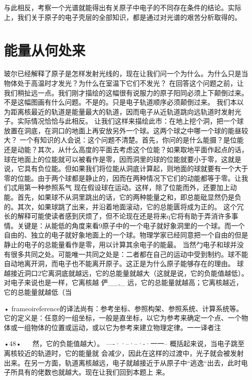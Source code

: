 与此相反，考察一个光谱就能得出有关原子中电子的不同存在条件的结论。实际上，我们关于原子的电子壳层的全部知识，都是通过对光谱的艰苦分析取得的。

\section{能量从何处来}

玻尔已经解释了原子是怎样发射光线的，现在让我们问一个为什么。为什么只是当物体处于高温时才发光？为什么在室温下它们不发光？
在回答这个问题之前，让我们稍扯远一点。我们刚才描绘的这幅很有说服力的原子阳同必须上下颠倒过来。不是这幅图画有什么问题。不是的。只是电子轨道顺序必须颠倒过来。
我们本以为距离核最近的轨道是能量最大的轨道，因而电子从近轨道跳向远轨道时发射光子。实际情况恰恰与此相反。
让我们这样来描绘此市：在地上挖个洞，把一个球放置在洞底，在洞口的地面上再安放另外一个球。这两个球之中哪一个球的能昼较大？
一个有知识的人会说：这个问题不清楚。首先，你问的是什么能摄？是位能还是动能？其次，从什么高度的平面去考虑这个位能？如果取地平面作起点的话，球在地面上的位能就可以被看作是零，因而洞里的球的位能就要小于零，这就是说，它具有负位能。但如果我们将位能从洞底计算起，则地面的球就要有一个大于零的位能。由于两个球都是静止的，因而在两种情况下它们的动能都等于零。让我们忒用第一种参照系气
现在假设球在运动。这样，除了位能而外，还要加上动能。首先，如果球不从洞里跳出的话，它的两种能量之和，即总能砒显然仍是负的。其次，如果球跳了出来，并沿着地面滚动，它的总能匮将成为正的。
这个冗长的解释可能使读者感到厌烦了，但不论现在还是将来q它将有助于弄消许多事情。关键是：从能低的角度来看9原子中的一个电子就好象洞里的一个球。而一个自由的、独立的电子就好象地面上的一个球。物理学家已经同意把一个自由的但是静止的电子的总能量看作是零，用以计算其余电子的能最。
当然勹电子和球并没有很多共同之处。可能唯一共同之处是：二者都在自己的运动中受到制约。球不能自动地离开洞，而电子也不能离开原子。这正是为什么原子能够存在的理由。
球越接近洞口2它离洞底就越远，它的总能量就越大（这就是说，它的负能值越低）。对电子来说也是一样，它离核越
俨__,_
远，它的总能量就越高；它离核越近，它的总能量就越低（当

 

 
•	frameoireference的译法尚有：参考坐标、参照构架、参照系统、计算系统等。它的定义是：任意的一组坐标，一般是直坐标，以它为参考来确定一个点、一个物体或一组物体的位置或运动，或以它为参考来建立物理定律。一一译者注

•48•
  
然，它的负能值越大）。
----··--·--·-·一一--
概括起来说，当电子跳至离核较近的轨道时，它的能量就
会减少，因此在这样的过渡中，光子就会被发射出来。在另一方面，轨道离核越远，电子就越接近于从原子中“逃逸“出去，此时电子所具有的佬数也就越大。现在让我们回到本题上
来。

